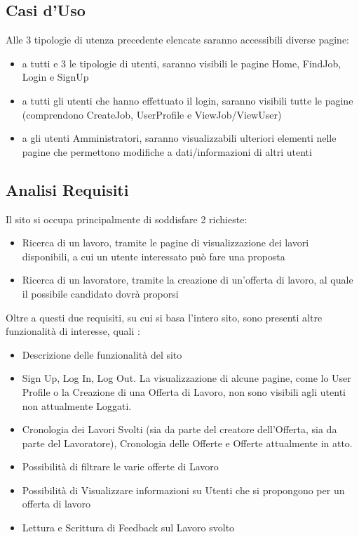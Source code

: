   \subsection{Casi d'Uso}
    Alle 3 tipologie di utenza precedente elencate saranno accessibili diverse pagine:
    \begin{itemize}
      \item a tutti e 3 le tipologie di utenti, saranno visibili le pagine Home, FindJob, Login e SignUp
      \item a tutti gli utenti che hanno effettuato il login, saranno visibili tutte le pagine (comprendono CreateJob, UserProfile e ViewJob/ViewUser)
      \item a gli utenti Amministratori, saranno visualizzabili ulteriori elementi nelle pagine che permettono modifiche a dati/informazioni di altri utenti
    \end{itemize}

  \subsection{Analisi Requisiti} 
    Il sito si occupa principalmente di soddisfare 2 richieste:
    \begin{itemize}
      \item Ricerca di un lavoro, tramite le pagine di visualizzazione dei lavori disponibili, a cui un utente interessato può fare una proposta
      \item Ricerca di un lavoratore, tramite la creazione di un’offerta di lavoro, al quale il possibile candidato dovrà proporsi
    \end{itemize}
    Oltre a questi due requisiti, su cui si basa l’intero sito, sono presenti altre funzionalità di interesse, quali :
    \begin{itemize}
      \item Descrizione delle funzionalità del sito
      \item Sign Up, Log In, Log Out. La visualizzazione di alcune pagine, come lo User Profile o la Creazione di una Offerta di Lavoro, non sono visibili agli utenti non 
      attualmente Loggati.
      \item Cronologia dei Lavori Svolti (sia da parte del creatore dell’Offerta, sia da parte del Lavoratore), Cronologia delle Offerte e Offerte attualmente in atto.
      \item Possibilità di filtrare le varie offerte di Lavoro
      \item Possibilità di Visualizzare informazioni su Utenti che si propongono per un offerta di lavoro
      \item Lettura e Scrittura di Feedback sul Lavoro svolto
    \end{itemize}
